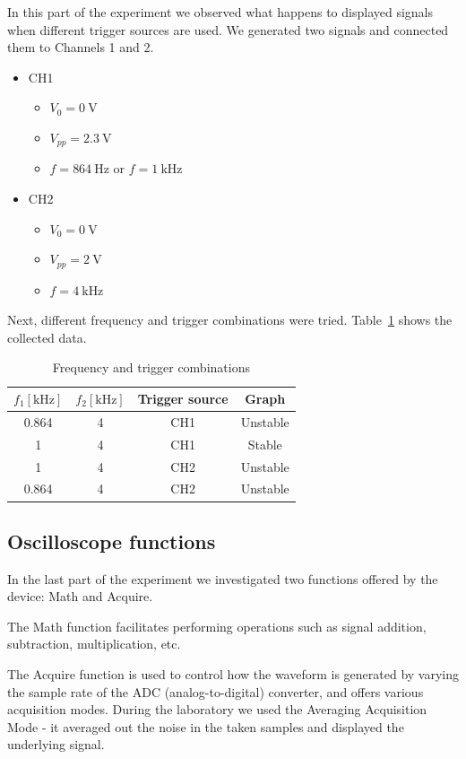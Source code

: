 In this part of the experiment we observed what happens to displayed signals when different trigger sources are used. We generated two signals and connected them to Channels 1 and 2.

\begin{itemize}
	\item CH1
	\begin{itemize}
		\item $V_{0} = \SI{0}{\volt}$
		\item $V_{pp} = \SI{2.3}{\volt}$
		\item $f = \SI{864}{\hertz}$ or $f = \SI{1}{\kilo\hertz}$
	\end{itemize}
	\item CH2
	\begin{itemize}
		\item $V_{0} = \SI{0}{\volt}$
		\item $V_{pp} = \SI{2}{\volt}$
		\item $f = \SI{4}{\kilo\hertz}$
	\end{itemize}
\end{itemize}

Next, different frequency and trigger combinations were tried. Table~\ref{tab:triggering} shows the collected data.

\begin{table}[H]
	\centering
	\begin{tabular}{c|c|c|c}
		$f_{1} [\unit{\kilo\hertz}]$ & $f_{2} [\unit{\kilo\hertz}]$ & Trigger source & Graph\\
		\hline
		0.864 & 4 & CH1 & Unstable\\
		\hline
		1 & 4 & CH1 & Stable\\
		\hline
		1 & 4 & CH2 & Unstable\\
		\hline
		0.864 & 4 & CH2 & Unstable\\
	\end{tabular}
	\caption{Frequency and trigger combinations}
	\label{tab:triggering}
\end{table}

\subsection{Oscilloscope functions}
In the last part of the experiment we investigated two functions offered by the device: Math and Acquire.

The Math function facilitates performing operations such as signal addition, subtraction, multiplication, etc.

The Acquire function is used to control how the waveform is generated by varying the sample rate of the ADC (analog-to-digital) converter, and offers various acquisition modes. During the laboratory we used the Averaging Acquisition Mode - it averaged out the noise in the taken samples and displayed the underlying signal.

